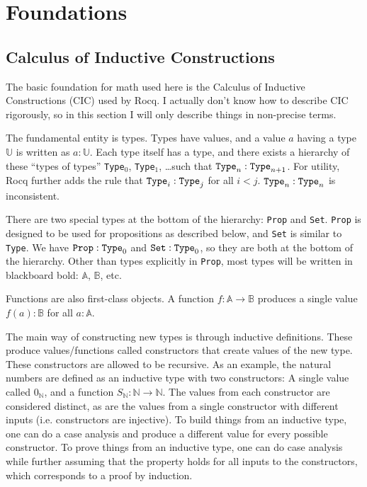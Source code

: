 \documentclass[../../math.tex]{subfiles}
\begin{document}
\chapter{Foundations} \label{chap_foundations}

\section{Calculus of Inductive Constructions}

The basic foundation for math used here is the Calculus of Inductive
Constructions (CIC) used by Rocq.  I actually don't know how to describe CIC
rigorously, so in this section I will only describe things in non-precise terms.

The fundamental entity is types.  Types have values, and a value $a$ having a
type $\mathbb U$ is written as $a : \mathbb U$.  Each type itself has a type,
and there exists a hierarchy of these ``types of types'' \verb|Type|$_0$,
\verb|Type|$_1$, \ldots such that $\verb|Type|_n : \verb|Type|_{n + 1}$.  For
utility, Rocq further adds the rule that $\verb|Type|_i : \verb|Type|_j$ for all
$i < j$.  $\verb|Type|_n : \verb|Type|_n$ is inconsistent.

There are two special types at the bottom of the hierarchy: \verb|Prop| and
\verb|Set|.  \verb|Prop| is designed to be used for propositions as described
below, and \verb|Set| is similar to \verb|Type|.  We have $\verb|Prop| :
\verb|Type|_0$ and $\verb|Set| : \verb|Type|_0$, so they are both at the bottom
of the hierarchy.  Other than types explicitly in \verb|Prop|, most types will
be written in blackboard bold: $\mathbb A$, $\mathbb B$, etc.

Functions are also first-class objects.  A function $f : \mathbb A \rightarrow
\mathbb B$ produces a single value $f(a) : \mathbb B$ for all $a : \mathbb A$.

The main way of constructing new types is through inductive definitions.  These
produce values/functions called constructors that create values of the new type.
These constructors are allowed to be recursive.  As an example, the natural
numbers are defined as an inductive type with two constructors: A single value
called $0_{\mathbb N}$, and a function $S_{\mathbb N} : \mathbb N \rightarrow
\mathbb N$.  The values from each constructor are considered distinct, as are
the values from a single constructor with different inputs (i.e. constructors
are injective).  To build things from an inductive type, one can do a case
analysis and produce a different value for every possible constructor.  To prove
things from an inductive type, one can do case analysis while further assuming
that the property holds for all inputs to the constructors, which corresponds to
a proof by induction.
\end{document}
